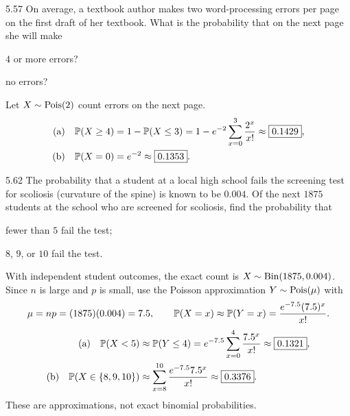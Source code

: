 \documentclass[11pt,oneside]{article}
\begin{document}
\begin{exercise}{5.57}
On average, a textbook author makes two word-processing errors per page on the first draft of her textbook. What is the probability that on the next page she will make
\begin{exercisesubparts}
\item $4$ or more errors?
\item no errors?
\end{exercisesubparts}
\end{exercise}
\begin{solution}
Let $X\sim\operatorname{Pois}(2)$ count errors on the next page.
\begin{align*}
\textup{(a)}\quad\mathbb{P}(X\ge4)
 &=1-\mathbb{P}(X\le3)
 =1-e^{-2}\sum_{x=0}^{3}\frac{2^x}{x!}
 \approx\boxed{0.1429},\\
\textup{(b)}\quad\mathbb{P}(X=0)&=e^{-2}\approx\boxed{0.1353}.
\end{align*}
\end{solution}

\begin{exercise}{5.62}
The probability that a student at a local high school fails the screening test for scoliosis (curvature of the spine) is known to be $0.004$. Of the next $1875$ students at the school who are screened for scoliosis, find the probability that
\begin{exercisesubparts}
\item fewer than $5$ fail the test;
\item $8$, $9$, or $10$ fail the test.
\end{exercisesubparts}
\end{exercise}
\begin{solution}
With independent student outcomes, the exact count is $X\sim\operatorname{Bin}(1875,0.004)$. Since $n$ is large and $p$ is small, use the Poisson approximation $Y\sim\operatorname{Pois}(\mu)$ with
\[
\mu=np=(1875)(0.004)=7.5,
\qquad\mathbb{P}(X=x)\approx\mathbb{P}(Y=x)=\frac{e^{-7.5}(7.5)^x}{x!}.
\]
\begin{align*}
\textup{(a)}\quad\mathbb{P}(X<5)&\approx\mathbb{P}(Y\le4)
 =e^{-7.5}\sum_{x=0}^{4}\frac{7.5^x}{x!}
 \approx\boxed{0.1321},\\
\textup{(b)}\quad\mathbb{P}(X\in\{8,9,10\})&\approx\sum_{x=8}^{10}\frac{e^{-7.5}7.5^x}{x!}
 \approx\boxed{0.3376}.
\end{align*}
These are approximations, not exact binomial probabilities.
\end{solution}
\end{document}
